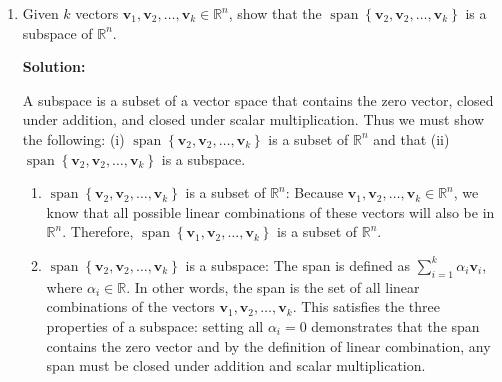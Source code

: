 \begin{enumerate}[label=(\alph*)]
	\item Given $k$ vectors $\mathbf{v}_1, \mathbf{v}_2, \ldots,
		      \mathbf{v}_{k} \in \mathbb{R}^n$, show that the
	      $\operatorname{span}\left\{\mathbf{v}_{2},
		      \mathbf{v}_{2}, \ldots, \mathbf{v}_{k}\right\}$ is a
	      subspace of $\mathbb{R}^n$.

	      \par \textbf{Solution:}
	      \par A subspace is a subset of a vector space that contains the zero
	      vector, closed under addition, and closed under scalar multiplication.
	      Thus we must show the following: (i) $\operatorname{span}\left\{\mathbf{v}_{2},
		      \mathbf{v}_{2}, \ldots, \mathbf{v}_{k}\right\}$ is a subset of
	      $\mathbb{R}^n$ and that (ii) $\operatorname{span}\left\{\mathbf{v}_{2},
		      \mathbf{v}_{2}, \ldots, \mathbf{v}_{k}\right\}$ is a subspace.

	      \begin{enumerate}[label=\roman*.]
		      \item $\operatorname{span}\left\{\mathbf{v}_{2},
			            \mathbf{v}_{2}, \ldots, \mathbf{v}_{k}\right\}$ is a subset of
		            $\mathbb{R}^n$: Because $\mathbf{v}_1, \mathbf{v}_2, \ldots,
			            \mathbf{v}_{k} \in \mathbb{R}^n$, we know that all possible linear
		            combinations of these vectors will also be in $\mathbb{R}^n$.
		            Therefore, $\operatorname{span}\left\{\mathbf{v}_{1},
			            \mathbf{v}_{2}, \ldots, \mathbf{v}_{k}\right\}$ is a subset of
		            $\mathbb{R}^n$.

		      \item $\operatorname{span}\left\{\mathbf{v}_{2},
			            \mathbf{v}_{2}, \ldots, \mathbf{v}_{k}\right\}$ is a subspace:
		            The span is defined as $\sum_{i=1}^{k} \alpha_i \mathbf{v}_i$,
		            where $\alpha_i \in \mathbb{R}$. In other words, the span is the set
		            of all linear combinations of the vectors $\mathbf{v}_1, \mathbf{v}_2,
			            \ldots, \mathbf{v}_{k}$. This satisfies the three properties of a
		            subspace: setting all $\alpha_i = 0$ demonstrates that the span
		            contains the zero vector and by the definition of linear combination,
		            any span must be closed under addition and scalar multiplication.
	      \end{enumerate}


\end{enumerate}
